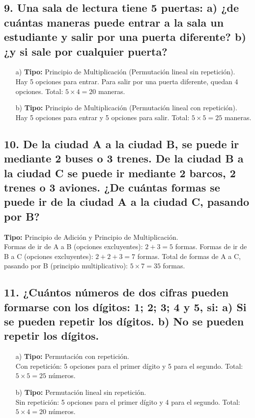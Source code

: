 \documentclass[11pt]{article}
\begin{document}
    \subsection*{9. Una sala de lectura tiene 5 puertas: a) ¿de cuántas maneras puede entrar a la sala un estudiante y salir por una puerta diferente? b) ¿y si sale por cualquier puerta?}
    \begin{itemize}
        \item[a)] \textbf{Tipo:} Principio de Multiplicación (Permutación lineal sin repetición). \\
        Hay 5 opciones para entrar. Para salir por una puerta diferente, quedan 4 opciones. Total: $5 \times 4 = 20$ maneras.
        \item[b)] \textbf{Tipo:} Principio de Multiplicación (Permutación lineal con repetición). \\
        Hay 5 opciones para entrar y 5 opciones para salir. Total: $5 \times 5 = 25$ maneras.
    \end{itemize}

    \subsection*{10. De la ciudad A a la ciudad B, se puede ir mediante 2 buses o 3 trenes. De la ciudad B a la ciudad C se puede ir mediante 2 barcos, 2 trenes o 3 aviones. ¿De cuántas formas se puede ir de la ciudad A a la ciudad C, pasando por B?}
    \textbf{Tipo:} Principio de Adición y Principio de Multiplicación. \\
    Formas de ir de A a B (opciones excluyentes): $2 + 3 = 5$ formas.
    Formas de ir de B a C (opciones excluyentes): $2 + 2 + 3 = 7$ formas.
    Total de formas de A a C, pasando por B (principio multiplicativo): $5 \times 7 = 35$ formas.

    \subsection*{11. ¿Cuántos números de dos cifras pueden formarse con los dígitos: 1; 2; 3; 4 y 5, si: a) Si se pueden repetir los dígitos. b) No se pueden repetir los dígitos.}
    \begin{itemize}
        \item[a)] \textbf{Tipo:} Permutación con repetición. \\
        Con repetición: 5 opciones para el primer dígito y 5 para el segundo. Total: $5 \times 5 = 25$ números.
        \item[b)] \textbf{Tipo:} Permutación lineal sin repetición. \\
        Sin repetición: 5 opciones para el primer dígito y 4 para el segundo. Total: $5 \times 4 = 20$ números.
    \end{itemize}
\end{document}
